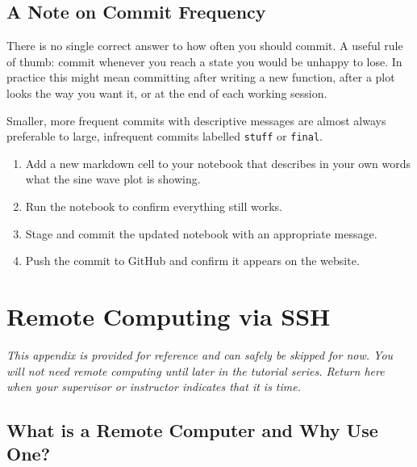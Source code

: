 \documentclass[nobib]{tufte-book}
\begin{document}
\section{A Note on Commit Frequency}

There is no single correct answer to how often you should commit.
A useful rule of thumb: commit whenever you reach a state you would be
unhappy to lose.
In practice this might mean committing after writing a new function, after
a plot looks the way you want it, or at the end of each working session.

Smaller, more frequent commits with descriptive messages are almost always
preferable to large, infrequent commits labelled \texttt{stuff} or
\texttt{final}.

\begin{exercisebox}
\begin{enumerate}
    \item Add a new markdown cell to your notebook that describes in your
          own words what the sine wave plot is showing.
    \item Run the notebook to confirm everything still works.
    \item Stage and commit the updated notebook with an appropriate message.
    \item Push the commit to GitHub and confirm it appears on the website.
\end{enumerate}
\end{exercisebox}

\appendix

\chapter{Remote Computing via SSH}
\label{app:remote}

\emph{This appendix is provided for reference and can safely be skipped
for now.
You will not need remote computing until later in the tutorial series.
Return here when your supervisor or instructor indicates that it is time.}

\section{What is a Remote Computer and Why Use One?}
\end{document}

